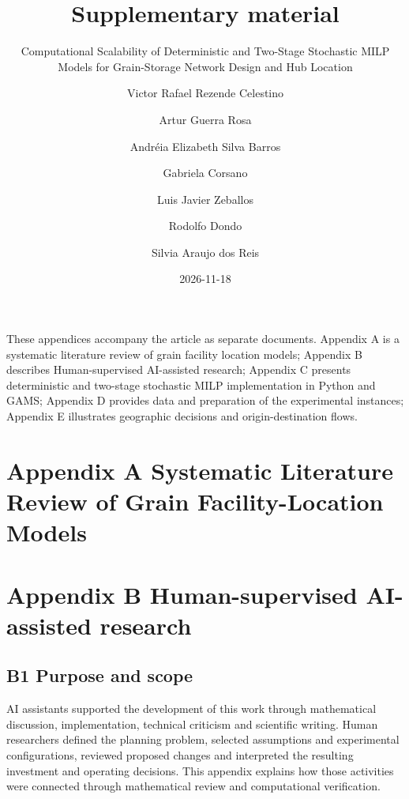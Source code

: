 \documentclass[
  english,
  11pt,
  a4paper,
]{article}
\title{Supplementary material}
\subtitle{Computational Scalability of Deterministic and Two-Stage
Stochastic MILP Models for Grain-Storage Network Design and Hub
Location}
\author{Victor Rafael Rezende Celestino \and Artur Guerra
Rosa \and Andréia Elizabeth Silva Barros \and Gabriela Corsano \and Luis
Javier Zeballos \and Rodolfo Dondo \and Silvia Araujo dos Reis}
\date{2026-11-18}
\renewcommand*\contentsname{Table of contents}
\newcommand\contentsname{Table of contents}
\begin{document}
\maketitle

\renewcommand*\contentsname{Table of contents}
{
\setcounter{tocdepth}{1}
\tableofcontents
}

\newpage{}

These appendices accompany the article as separate documents. Appendix A is a systematic literature review of grain facility location models; Appendix B describes Human-supervised AI-assisted research; Appendix C presents deterministic and two-stage stochastic MILP implementation in Python and GAMS; Appendix D provides data and preparation of the experimental instances; Appendix E illustrates geographic decisions and origin-destination flows.

\newpage{}

\section{Appendix A Systematic Literature Review of Grain Facility-Location Models}\label{appendix-a-systematic-literature-review-of-grain-facility-location-models}



%

\newpage{}

\section{Appendix B Human-supervised AI-assisted
research}\label{appendix-b-human-supervised-ai-assisted-research}

\subsection{B1 Purpose and scope}\label{b1-purpose-and-scope}

AI assistants supported the development of this work through
mathematical discussion, implementation, technical criticism and
scientific writing. Human researchers defined the planning problem,
selected assumptions and experimental configurations, reviewed proposed
changes and interpreted the resulting investment and operating
decisions. This appendix explains how those activities were connected
through mathematical review and computational verification.
\end{document}
